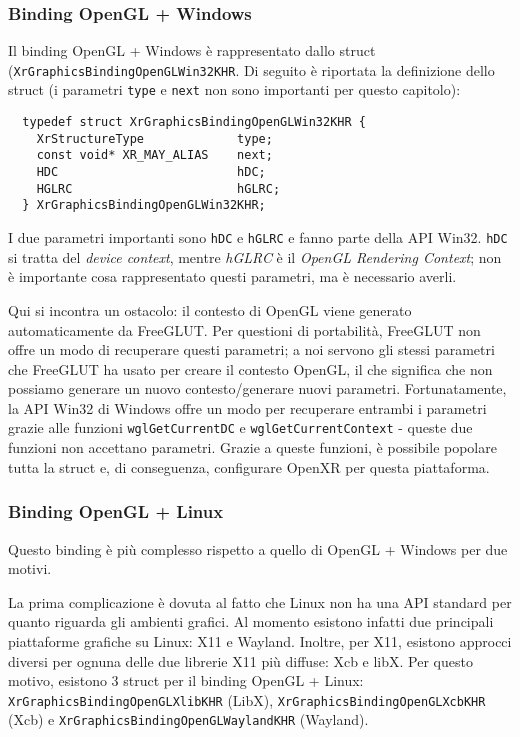 \documentclass[twoside]{supsistudent}
\begin{document}
\subsubsection{Binding OpenGL + Windows}

Il binding OpenGL + Windows è rappresentato dallo struct (\texttt{XrGraphicsBindingOpenGLWin32KHR}. Di seguito è riportata la definizione dello struct (i parametri \texttt{type} e \texttt{next} non sono importanti per questo capitolo):

\begin{verbatim}
  typedef struct XrGraphicsBindingOpenGLWin32KHR {
    XrStructureType             type;
    const void* XR_MAY_ALIAS    next;
    HDC                         hDC;
    HGLRC                       hGLRC;
  } XrGraphicsBindingOpenGLWin32KHR;
\end{verbatim}

I due parametri importanti sono \texttt{hDC} e \texttt{hGLRC} e fanno parte della API Win32. \texttt{hDC} si tratta del \textit{device context}, mentre \textit{hGLRC} è il \textit{OpenGL Rendering Context}; non è importante cosa rappresentato questi parametri, ma è necessario averli.

Qui si incontra un ostacolo: il contesto di OpenGL viene generato automaticamente da FreeGLUT. Per questioni di portabilità, FreeGLUT non offre un modo di recuperare questi parametri; a noi servono gli stessi parametri che FreeGLUT ha usato per creare il contesto OpenGL, il che significa che non possiamo generare un nuovo contesto/generare nuovi parametri. Fortunatamente, la API Win32 di Windows offre un modo per recuperare entrambi i parametri grazie alle funzioni \texttt{wglGetCurrentDC} e \texttt{wglGetCurrentContext} - queste due funzioni non accettano parametri. Grazie a queste funzioni, è possibile popolare tutta la struct e, di conseguenza, configurare OpenXR per questa piattaforma.

\subsubsection{Binding OpenGL + Linux}

Questo binding è più complesso rispetto a quello di OpenGL + Windows per due motivi.

La prima complicazione è dovuta al fatto che Linux non ha una API standard per quanto riguarda gli ambienti grafici. Al momento esistono infatti due principali piattaforme grafiche su Linux: X11 e Wayland. Inoltre, per X11, esistono approcci diversi per ognuna delle due librerie X11 più diffuse: Xcb e libX. Per questo motivo, esistono 3 struct per il binding OpenGL + Linux: \texttt{XrGraphicsBindingOpenGLXlibKHR} (LibX), \texttt{XrGraphicsBindingOpenGLXcbKHR} (Xcb) e \texttt{XrGraphicsBindingOpenGLWaylandKHR} (Wayland).
\end{document}
